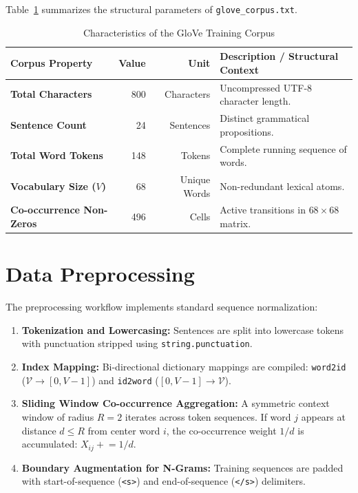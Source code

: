 Table~\ref{tab:exp6_corpus_stats} summarizes the structural parameters of \texttt{glove\_corpus.txt}.
\begin{table}[H]
\centering
\small
\caption{Characteristics of the GloVe Training Corpus}
\label{tab:exp6_corpus_stats}
\begin{tabular}{lrrp{7.5cm}}
\toprule
\textbf{Corpus Property} & \textbf{Value} & \textbf{Unit} & \textbf{Description / Structural Context} \\
\midrule
\textbf{Total Characters} & 800 & Characters & Uncompressed UTF-8 character length. \\
\textbf{Sentence Count} & 24 & Sentences & Distinct grammatical propositions. \\
\textbf{Total Word Tokens} & 148 & Tokens & Complete running sequence of words. \\
\textbf{Vocabulary Size ($V$)} & 68 & Unique Words & Non-redundant lexical atoms. \\
\textbf{Co-occurrence Non-Zeros} & 496 & Cells & Active transitions in $68 \times 68$ matrix. \\
\bottomrule
\end{tabular}
\end{table}

\section{Data Preprocessing}
The preprocessing workflow implements standard sequence normalization:
\begin{enumerate}
    \item \textbf{Tokenization and Lowercasing:} Sentences are split into lowercase tokens with punctuation stripped using \texttt{string.punctuation}.
    \item \textbf{Index Mapping:} Bi-directional dictionary mappings are compiled: \texttt{word2id} ($\mathcal{V} \to [0, V-1]$) and \texttt{id2word} ($[0, V-1] \to \mathcal{V}$).
    \item \textbf{Sliding Window Co-occurrence Aggregation:} A symmetric context window of radius $R = 2$ iterates across token sequences. If word $j$ appears at distance $d \le R$ from center word $i$, the co-occurrence weight $1/d$ is accumulated: $X_{ij} \mathrel{+}= 1/d$.
    \item \textbf{Boundary Augmentation for N-Grams:} Training sequences are padded with start-of-sequence (\texttt{<s>}) and end-of-sequence (\texttt{</s>}) delimiters.
\end{enumerate}

